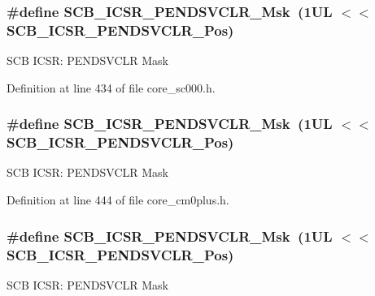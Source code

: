 \subsubsection[{\texorpdfstring{S\+C\+B\+\_\+\+I\+C\+S\+R\+\_\+\+P\+E\+N\+D\+S\+V\+C\+L\+R\+\_\+\+Msk}{SCB_ICSR_PENDSVCLR_Msk}}]{\setlength{\rightskip}{0pt plus 5cm}\#define S\+C\+B\+\_\+\+I\+C\+S\+R\+\_\+\+P\+E\+N\+D\+S\+V\+C\+L\+R\+\_\+\+Msk~(1\+U\+L $<$$<$ S\+C\+B\+\_\+\+I\+C\+S\+R\+\_\+\+P\+E\+N\+D\+S\+V\+C\+L\+R\+\_\+\+Pos)}\hypertarget{group___c_m_s_i_s___s_c_b_ga4a901ace381d3c1c74ac82b22fae2e1e}{}\label{group___c_m_s_i_s___s_c_b_ga4a901ace381d3c1c74ac82b22fae2e1e}
S\+CB I\+C\+SR\+: P\+E\+N\+D\+S\+V\+C\+LR Mask 

Definition at line 434 of file core\+\_\+sc000.\+h.

\subsubsection[{\texorpdfstring{S\+C\+B\+\_\+\+I\+C\+S\+R\+\_\+\+P\+E\+N\+D\+S\+V\+C\+L\+R\+\_\+\+Msk}{SCB_ICSR_PENDSVCLR_Msk}}]{\setlength{\rightskip}{0pt plus 5cm}\#define S\+C\+B\+\_\+\+I\+C\+S\+R\+\_\+\+P\+E\+N\+D\+S\+V\+C\+L\+R\+\_\+\+Msk~(1\+U\+L $<$$<$ S\+C\+B\+\_\+\+I\+C\+S\+R\+\_\+\+P\+E\+N\+D\+S\+V\+C\+L\+R\+\_\+\+Pos)}\hypertarget{group___c_m_s_i_s___s_c_b_ga4a901ace381d3c1c74ac82b22fae2e1e}{}\label{group___c_m_s_i_s___s_c_b_ga4a901ace381d3c1c74ac82b22fae2e1e}
S\+CB I\+C\+SR\+: P\+E\+N\+D\+S\+V\+C\+LR Mask 

Definition at line 444 of file core\+\_\+cm0plus.\+h.

\subsubsection[{\texorpdfstring{S\+C\+B\+\_\+\+I\+C\+S\+R\+\_\+\+P\+E\+N\+D\+S\+V\+C\+L\+R\+\_\+\+Msk}{SCB_ICSR_PENDSVCLR_Msk}}]{\setlength{\rightskip}{0pt plus 5cm}\#define S\+C\+B\+\_\+\+I\+C\+S\+R\+\_\+\+P\+E\+N\+D\+S\+V\+C\+L\+R\+\_\+\+Msk~(1\+U\+L $<$$<$ S\+C\+B\+\_\+\+I\+C\+S\+R\+\_\+\+P\+E\+N\+D\+S\+V\+C\+L\+R\+\_\+\+Pos)}\hypertarget{group___c_m_s_i_s___s_c_b_ga4a901ace381d3c1c74ac82b22fae2e1e}{}\label{group___c_m_s_i_s___s_c_b_ga4a901ace381d3c1c74ac82b22fae2e1e}
S\+CB I\+C\+SR\+: P\+E\+N\+D\+S\+V\+C\+LR Mask 

